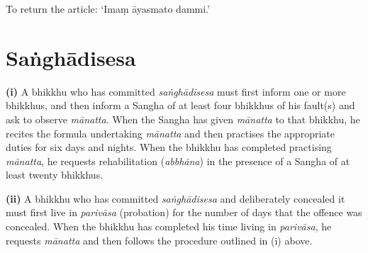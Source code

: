 
To return the article: ‘Imaṃ āyasmato dammi.’ 

\section{Saṅghādisesa}

\textbf{(i)} A bhikkhu who has committed \emph{saṅghādisesa} must first inform
one or more bhikkhus, and then inform a Sangha of at least four bhikkhus of his
fault(s) and ask to observe \emph{mānatta}. When the Sangha has given
\emph{mānatta} to that bhikkhu, he recites the formula undertaking
\emph{mānatta} and then practises the appropriate duties for six days and
nights. When the bhikkhu has completed practising \emph{mānatta}, he requests
rehabilitation (\emph{abbhāna}) in the presence of a Sangha of at least twenty
bhikkhus.

\textbf{(ii)} A bhikkhu who has committed \emph{saṅghādisesa} and deliberately
concealed it must first live in \emph{parivāsa} (probation) for the number of
days that the offence was concealed. When the bhikkhu has completed his time
living in \emph{parivāsa}, he requests \emph{mānatta} and then follows the
procedure outlined in (i) above.

